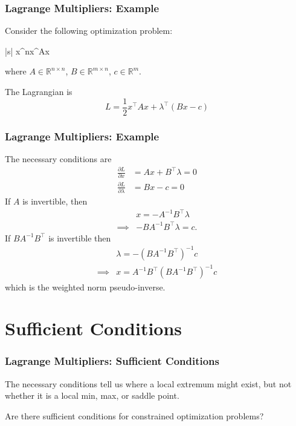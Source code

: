 \documentclass{beamer}
\begin{document}
\begin{frame}\frametitle{Lagrange Multipliers: Example}
	Consider the following optimization problem:
	\begin{mini*}|s|
		{x\in{}^n}{x^\top Ax}{}{}
	\end{mini*}		
	where $A\in\mathbb{R}^{n\times n}$, 
	$B\in\mathbb{R}^{m\times n}$, 
	$c \in \mathbb{R}^{m}$.
	
	The Lagrangian is
	\[ 
		L = \frac{1}{2}x^\top Ax + \lambda^\top (Bx - c) 
	\]
\end{frame}

\begin{frame}\frametitle{Lagrange Multipliers: Example}
	The necessary conditions are
	\begin{align*}
		\frac{\partial L}{\partial x} &= Ax + B^\top \lambda = 0 \\
		\frac{\partial L}{\partial \lambda} &= Bx - c = 0
	\end{align*}
	If $A$ is invertible, then
	\begin{align*}
		& x = -A^{-1}B^\top \lambda	\\
		\implies & -BA^{-1}B^\top \lambda = c.
	\end{align*}
	If $BA^{-1}B^\top$ is invertible then
	\begin{align*}
		& 	\lambda = -(BA^{-1}B^\top )^{-1}c \\
		\implies & x = A^{-1}B^\top (BA^{-1}B^\top )^{-1}c
	\end{align*}
	which is the weighted norm pseudo-inverse.	
\end{frame}

\section{Sufficient Conditions}
\frame{\sectionpage}

\begin{frame}\frametitle{Lagrange Multipliers: Sufficient Conditions}
	The necessary conditions tell us where a local extremum might exist, but not whether it is a local min, max, or saddle point.
	
	\vfill
	
	Are there sufficient conditions for constrained optimization problems?	
\end{frame}
\end{document}
